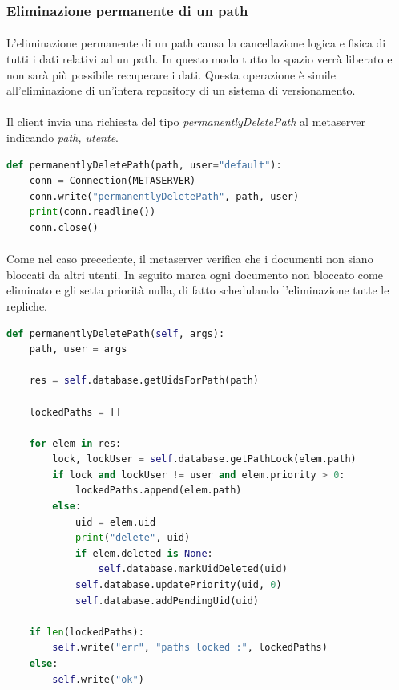 \documentclass[11pt,a4paper,english]{article}
\begin{document}
\subsubsection{Eliminazione permanente di un path}

\paragraph{} L'eliminazione permanente di un path causa la cancellazione logica e fisica di tutti i dati relativi ad un path. In questo modo tutto lo spazio verrà liberato e non sarà più possibile recuperare i dati. Questa operazione è simile all'eliminazione di un'intera repository di un sistema di versionamento. 

\paragraph{} Il client invia una richiesta del tipo \emph{permanentlyDeletePath} al metaserver indicando \emph{path, utente}.

\begin{lstlisting}[language=Python, title=Codice]
def permanentlyDeletePath(path, user="default"):
    conn = Connection(METASERVER)
    conn.write("permanentlyDeletePath", path, user)
    print(conn.readline())
    conn.close()
\end{lstlisting}

\paragraph{} Come nel caso precedente, il metaserver verifica che i documenti non siano bloccati da altri utenti. In seguito marca ogni documento non bloccato come eliminato e gli setta priorità nulla, di fatto schedulando l'eliminazione tutte le repliche.

\begin{lstlisting}[language=Python, title=Codice]
def permanentlyDeletePath(self, args):
    path, user = args

    res = self.database.getUidsForPath(path)

    lockedPaths = []

    for elem in res:
        lock, lockUser = self.database.getPathLock(elem.path)
        if lock and lockUser != user and elem.priority > 0:
            lockedPaths.append(elem.path)
        else:
            uid = elem.uid
            print("delete", uid)
            if elem.deleted is None:
                self.database.markUidDeleted(uid)
            self.database.updatePriority(uid, 0)
            self.database.addPendingUid(uid)

    if len(lockedPaths):
        self.write("err", "paths locked :", lockedPaths)
    else:
        self.write("ok")
\end{lstlisting}
\end{document}
